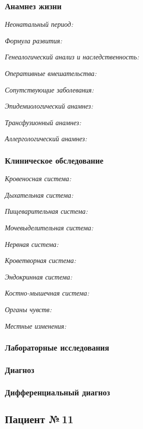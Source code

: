 \documentclass[a4paper,14pt]{extarticle}
\begin{document}
\subsubsection*{Анамнез жизни}

\emph{Неонатальный период:}

\emph{Формула развития:}

\emph{Генеалогический анализ и наследственность:}

\emph{Оперативные вмешательства:}

\emph{Сопутствующие заболевания:}

\emph{Эпидемиологический анамнез:}

\emph{Трансфузионный анамнез:}

\emph{Аллергологический анамнез:}

\subsubsection*{Клиническое обследование}

\emph{Кровеносная система:}

\emph{Дыхательная система:}

\emph{Пищеварительная система:}

\emph{Мочевыделительная система:}

\emph{Нервная система:} 

\emph{Кроветворная система:}

\emph{Эндокринная система:}

\emph{Костно-мышечная система:}

\emph{Органы чувств:}

\emph{Местные изменения:}

\subsubsection*{Лабораторные исследования}

\subsubsection*{Диагноз}

\subsubsection*{Дифференциальный диагноз}

\newpage
\subsection*{Пациент №\,11}
\end{document}
